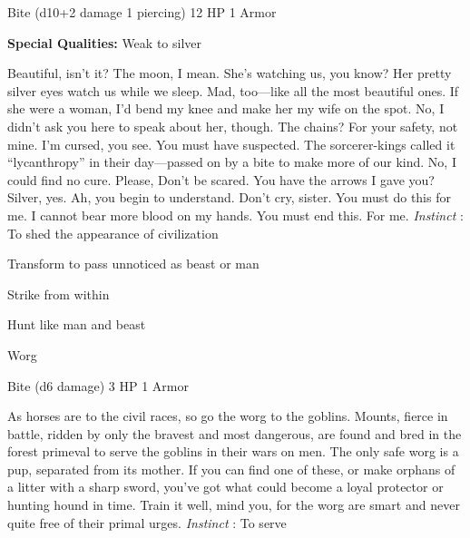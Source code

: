 Bite (d10+2 damage 1 piercing)	12 HP	1 Armor

 


 
\startMonsterQualities
{\bf Special Qualities:}  Weak to silver
\stopMonsterQualities
 
\startMonsterDescription
Beautiful, isn’t it? The moon, I mean. She’s watching us, you know? Her pretty silver eyes watch us while we sleep. Mad, too—like all the most beautiful ones. If she were a woman, I’d bend my knee and make her my wife on the spot. No, I didn’t ask you here to speak about her, though. The chains? For your safety, not mine. I’m cursed, you see. You must have suspected. The sorcerer-kings called it “lycanthropy” in their day—passed on by a bite to make more of our kind. No, I could find no cure. Please, Don’t be scared. You have the arrows I gave you? Silver, yes. Ah, you begin to understand. Don’t cry, sister. You must do this for me. I cannot bear more blood on my hands. You must end this. For me. {\em Instinct} : To shed the appearance of civilization
\stopMonsterDescription
 
\startitemize[1,packed]

\item Transform to pass unnoticed as beast or man

 
\item Strike from within

 
\item Hunt like man and beast


\stopitemize
 
\startMonsterName
Worg	 
\stopMonsterName
 

Bite (d6 damage)	3 HP	1 Armor

 


 
\startMonsterDescription
As horses are to the civil races, so go the worg to the goblins. Mounts, fierce in battle, ridden by only the bravest and most dangerous, are found and bred in the forest primeval to serve the goblins in their wars on men. The only safe worg is a pup, separated from its mother. If you can find one of these, or make orphans of a litter with a sharp sword, you’ve got what could become a loyal protector or hunting hound in time. Train it well, mind you, for the worg are smart and never quite free of their primal urges. {\em Instinct} : To serve
\stopMonsterDescription
 
\startitemize[1,packed]

